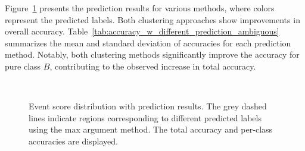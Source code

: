 \documentclass[12pt]{article}
\begin{document}
    Figure~\ref{fig:event_score_distribution_w_prediction_ambiguous} presents the prediction results for various methods, where colors represent the predicted labels. Both clustering approaches show improvements in overall accuracy. Table~\ref{tab:accuracy_w_different_prediction_ambiguous} summarizes the mean and standard deviation of accuracies for each prediction method. Notably, both clustering methods significantly improve the accuracy for pure class $B$, contributing to the observed increase in total accuracy.
   \begin{figure}[htpb]
        \centering
         \\
        \caption{Event score distribution with prediction results. The grey dashed lines indicate regions corresponding to different predicted labels using the max argument method. The total accuracy and per-class accuracies are displayed.}
        \label{fig:event_score_distribution_w_prediction_ambiguous}
    \end{figure}
\end{document}
